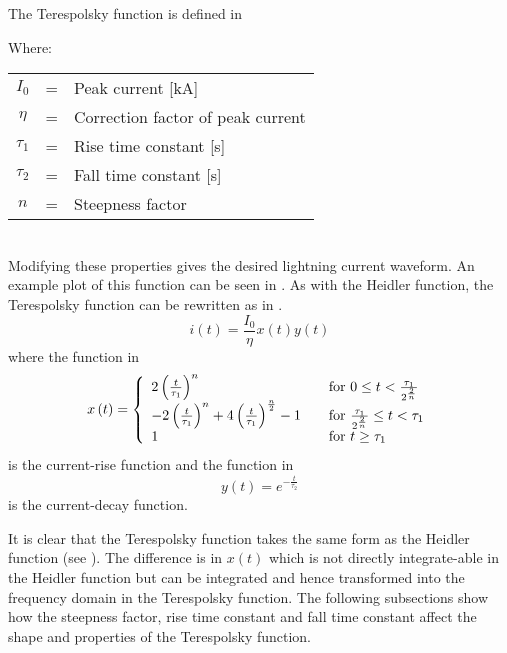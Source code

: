 The Terespolsky function is defined in 

Where: \\
\begin{tabular}{cll}
	$I_0$ & = & Peak current [kA] \\
	$\eta$ & = & Correction factor of peak current \\
	$\tau_1$ & = & Rise time constant [s] \\
	$\tau_2$ & = & Fall time constant [s] \\
	$n$ & = & Steepness factor
\end{tabular}\\

Modifying these properties gives the desired lightning current waveform. An example plot of this function can be seen in .
As with the Heidler function, the Terespolsky function can be rewritten as in .
\begin{equation}
i(t) = \frac{I_0}{\eta} x \left( t \right) y \left( t \right)
\label{eqn:TFSmall}
\end{equation}
where the function in 
\begin{equation}
	x \left( t \right) = \left\{
	  \begin{array}{l l}
	    2 \left( \frac{t}{\tau_1} \right )^n & \quad \textrm{for $0 \leq t < \frac{\tau_1}{2^{\frac{2}{n}}}$} \\
	    -2 \left( \frac{t}{\tau_1} \right )^n +4 \left( \frac{t}{\tau_1} \right )^{\frac{n}{2}} -1 & \quad \textrm{for $\frac{\tau_1}{2^{\frac{2}{n}}} \leq t < \tau_1$} \\
	    1 & \quad \textrm{for $t \geq \tau_1$}
	  \end{array} \right.
	\label{eqn:TFrise}
\end{equation}
is the current-rise function and the function in 
\begin{equation}
	y \left( t \right) = e^{-\frac{t}{\tau_2}}
	\label{eqn:TFfall}
\end{equation}
is the current-decay function.

It is clear that the Terespolsky function takes the same form as the Heidler function (see ). The difference is in $x \left( t \right)$ which is not directly integrate-able in the Heidler function but can be integrated and hence transformed into the frequency domain in the Terespolsky function. The following subsections show how the steepness factor, rise time constant and fall time constant affect the shape and properties of the Terespolsky function.


